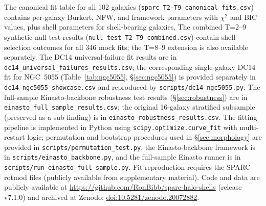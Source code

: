 The canonical fit table for all 102 galaxies (\texttt{sparc\_T2-T9\_canonical\_fits.csv}) contains per-galaxy Burkert, NFW, and framework parameters with $\chi^2$ and BIC values, plus shell parameters for shell-bearing galaxies. The combined T=2--9 synthetic null test results (\texttt{null\_test\_T2-T9\_combined.csv}) contain shell-selection outcomes for all 346 mock fits; the T=8--9 extension is also available separately. The DC14 universal-failure fit results are in \texttt{dc14\_universal\_failures\_results.csv}; the corresponding single-galaxy DC14 fit for NGC~5055 (Table~\ref{tab:ngc5055}, \S\ref{sec:ngc5055}) is provided separately in \texttt{dc14\_ngc5055\_showcase.csv} and reproduced by \texttt{scripts/dc14\_ngc5055.py}. The full-sample Einasto-backbone robustness test results (\S\ref{sec:robustness}) are in \texttt{einasto\_full\_sample\_results.csv}; the original 16-galaxy stratified subsample (preserved as a sub-finding) is in \texttt{einasto\_robustness\_results.csv}. The fitting pipeline is implemented in Python using \texttt{scipy.optimize.curve\_fit} with multi-restart logic; permutation and bootstrap procedures used in \S\ref{sec:morphology} are provided in \texttt{scripts/permutation\_test.py}, the Einasto-backbone framework is in \texttt{scripts/einasto\_backbone.py}, and the full-sample Einasto runner is in \texttt{scripts/run\_einasto\_full\_sample.py}. Fit reproduction requires the SPARC rotmod files (publicly available from \citealt{Lelli2016} supplementary material). Code and data are publicly available at \url{https://github.com/RonBibb/sparc-halo-shells} (release v7.1.0) and archived at Zenodo: \href{https://doi.org/10.5281/zenodo.20072882}{doi:10.5281/zenodo.20072882}.

